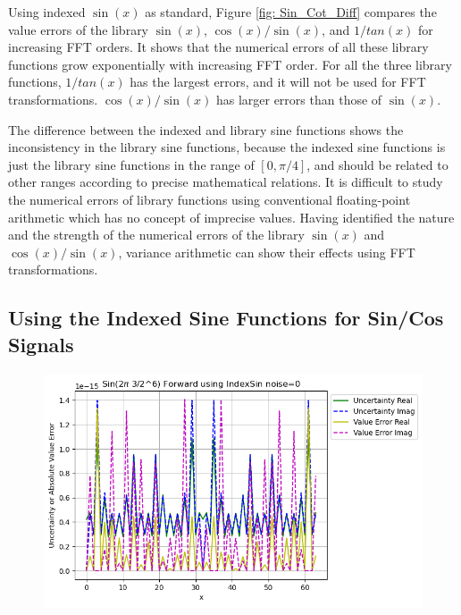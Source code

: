 \documentclass[twoside]{article}
\numberwithin{equation}{section}
\begin{document}
Using indexed $\sin(x)$ as standard, Figure \ref{fig: Sin_Cot_Diff} compares the value errors of the library $\sin(x)$, $\cos(x)/\sin(x)$, and $1/tan(x)$ for increasing FFT orders.
It shows that the numerical errors of all these library functions grow exponentially with  increasing FFT order.
For all the three library functions, $1/tan(x)$ has the largest errors, and it will not be used for FFT transformations.
$\cos(x)/\sin(x)$ has larger errors than those of $\sin(x)$.

The difference between the indexed and library sine functions shows the inconsistency in the library sine functions, because the indexed sine functions is just the library sine functions in the range of $[0, \pi/4]$, and should be related to other ranges according to precise mathematical relations.
It is difficult to study the numerical errors of library functions using conventional floating-point arithmetic which has no concept of imprecise values.
Having identified the nature and the strength of the numerical errors of the library $\sin(x)$ and $\cos(x)/\sin(x)$, variance arithmetic can show their effects using FFT transformations.



\subsection{Using the Indexed Sine Functions for Sin/Cos Signals}

\begin{figure}[p]
\includegraphics[height=2.75in]{FFT_Sin_Clean_6_3_Spec_Indexed.png} 
\label{fig: FFT_Sin_Clean_6_3_Spec_Indexed}
\end{figure}
\end{document}
